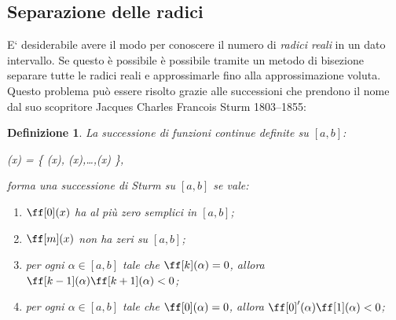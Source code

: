 \documentclass[twoside,10pt]{article}
\theoremstyle{plain}
\newtheorem{definizione}{Definizione}
\theoremstyle{nonumberplain}
\let\Cal\mathcal
\begin{document}
\subsection{Separazione delle radici}
E` desiderabile avere il modo per conoscere il numero di \emph{radici
reali} in un dato intervallo.  Se questo \`e possibile \`e possibile
tramite un metodo di bisezione separare tutte le radici reali e
approssimarle fino alla approssimazione voluta.  Questo problema pu\`o
essere risolto grazie alle successioni che prendono il nome dal suo
scopritore Jacques Charles Francois Sturm 1803--1855:
\begin{definizione}\label{def:sturm}
    La successione di funzioni continue definite su $[a,b]$:
    \begin{EQ}
        \Cal{F}(x) = \{ \ff[0](x), \ff[1](x),\ldots,\ff[m](x) \},
    \end{EQ}
    forma una \emph{successione di Sturm su $[a,b]$} se  vale:
    \begin{enumerate}
        \item $\ff[0](x)$ ha al pi\`u zero semplici in $[a,b]$;
        \item $\ff[m](x)$ non ha zeri su $[a,b]$;
        \item per ogni $\alpha\in[a,b]$ tale che $\ff[k](\alpha)=0$, allora
        $\ff[k-1](\alpha)\ff[k+1](\alpha)<0$;
        \item per ogni $\alpha\in[a,b]$ tale che $\ff[0](\alpha)=0$, allora
        $\ff[0]'(\alpha)\ff[1](\alpha) < 0$;
    \end{enumerate}
\end{definizione}
\end{document}
